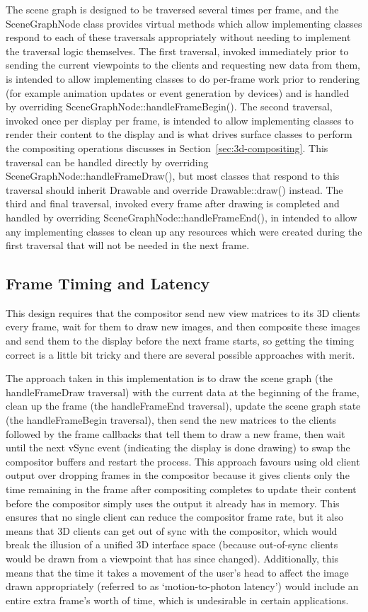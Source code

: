 The scene graph is designed to be traversed several times per frame, and the SceneGraphNode class provides virtual methods which allow implementing classes respond to each of these traversals appropriately without needing to implement the traversal logic themselves. The first traversal, invoked immediately prior to sending the current viewpoints to the clients and requesting new data from them, is intended to allow implementing classes to do per-frame work prior to rendering (for example animation updates or event generation by devices) and is handled by overriding SceneGraphNode::handleFrameBegin(). The second traversal, invoked once per display per frame, is intended to allow implementing classes to render their content to the display and is what drives surface classes to perform the compositing operations discusses in Section~\ref{sec:3d-compositing}. This traversal can be handled directly by overriding SceneGraphNode::handleFrameDraw(), but most classes that respond to this traversal should inherit Drawable and override Drawable::draw() instead. The third and final traversal, invoked every frame after drawing is completed and handled by overriding SceneGraphNode::handleFrameEnd(), in intended to allow any implementing classes to clean up any resources which were created during the first traversal that will not be needed in the next frame.

\subsection{Frame Timing and Latency}

This design requires that the compositor send new view matrices to its 3D clients every frame, wait for them to draw new images, and then composite these images and send them to the display before the next frame starts, so getting the timing correct is a little bit tricky and there are several possible approaches with merit. 

The approach taken in this implementation is to draw the scene graph (the handleFrameDraw traversal) with the current data at the beginning of the frame, clean up the frame (the handleFrameEnd traversal), update the scene graph state (the handleFrameBegin traversal), then send the new matrices to the clients followed by the frame callbacks that tell them to draw a new frame, then wait until the next vSync event (indicating the display is done drawing) to swap the compositor buffers and restart the process. This approach favours using old client output over dropping frames in the compositor because it gives clients only the time remaining in the frame after compositing completes to update their content before the compositor simply uses the output it already has in memory. This ensures that no single client can reduce the compositor frame rate, but it also means that 3D clients can get out of sync with the compositor, which would break the illusion of a unified 3D interface space (because out-of-sync clients would be drawn from a viewpoint that has since changed). Additionally, this means that the time it takes a movement of the user's head to affect the image drawn appropriately (referred to as `motion-to-photon latency') would include an entire extra frame's worth of time, which is undesirable in certain applications.

